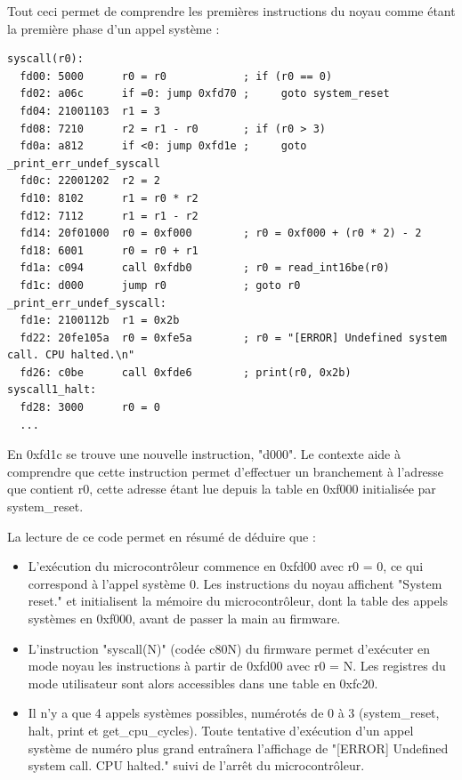\documentclass[a4paper,10pt]{article}
\begin{document}
Tout ceci permet de comprendre les premières instructions du noyau comme étant la première phase d'un appel système :
\begin{verbatim}
syscall(r0):
  fd00: 5000      r0 = r0            ; if (r0 == 0)
  fd02: a06c      if =0: jump 0xfd70 ;     goto system_reset
  fd04: 21001103  r1 = 3
  fd08: 7210      r2 = r1 - r0       ; if (r0 > 3)
  fd0a: a812      if <0: jump 0xfd1e ;     goto _print_err_undef_syscall
  fd0c: 22001202  r2 = 2
  fd10: 8102      r1 = r0 * r2
  fd12: 7112      r1 = r1 - r2
  fd14: 20f01000  r0 = 0xf000        ; r0 = 0xf000 + (r0 * 2) - 2
  fd18: 6001      r0 = r0 + r1
  fd1a: c094      call 0xfdb0        ; r0 = read_int16be(r0)
  fd1c: d000      jump r0            ; goto r0
_print_err_undef_syscall:
  fd1e: 2100112b  r1 = 0x2b
  fd22: 20fe105a  r0 = 0xfe5a        ; r0 = "[ERROR] Undefined system call. CPU halted.\n"
  fd26: c0be      call 0xfde6        ; print(r0, 0x2b)
syscall1_halt:
  fd28: 3000      r0 = 0
  ...
\end{verbatim}

En 0xfd1c se trouve une nouvelle instruction, "d000". Le contexte aide à comprendre que cette instruction permet d'effectuer un branchement à l'adresse que contient r0, cette adresse étant lue depuis la table en 0xf000 initialisée par system\_reset.

La lecture de ce code permet en résumé de déduire que :
\begin{itemize}
\item L'exécution du microcontrôleur commence en 0xfd00 avec r0 = 0, ce qui correspond à l'appel système 0. Les instructions du noyau affichent "System reset." et initialisent la mémoire du microcontrôleur, dont la table des appels systèmes en 0xf000, avant de passer la main au firmware.
\item L'instruction "syscall(N)" (codée c80N) du firmware permet d'exécuter en mode noyau les instructions à partir de 0xfd00 avec r0 = N. Les registres du mode utilisateur sont alors accessibles dans une table en 0xfc20.
\item Il n'y a que 4 appels systèmes possibles, numérotés de 0 à 3 (system\_reset, halt, print et get\_cpu\_cycles). Toute tentative d'exécution d'un appel système de numéro plus grand entraînera l'affichage de "[ERROR] Undefined system call. CPU halted." suivi de l'arrêt du microcontrôleur.
\end{itemize}
\end{document}
